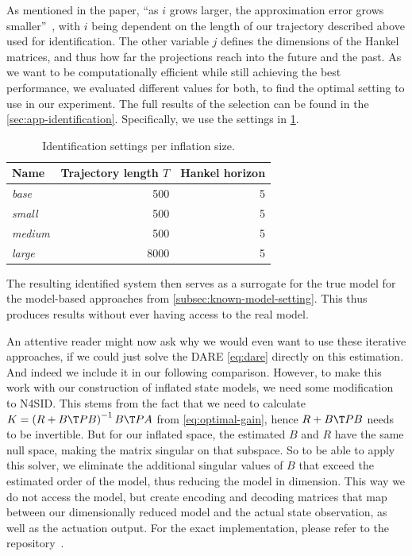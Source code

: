 As mentioned in the paper, ``as $i$ grows larger, the approximation error grows smaller''~\cite[Sec.~5.3]{VanOverschee1994N4SID},
with $i$ being dependent on the length of our trajectory described above used for identification. The other variable $j$
defines the dimensions of the Hankel matrices, and thus how far the projections reach into the future and the past.
As we want to be computationally efficient while still achieving the best performance, we evaluated different values
for both, to find the optimal setting to use in our experiment. The full results of the selection can be found in the
\cref{sec:app-identification}. Specifically, we use the settings in
\cref{tab:identification-settings}.
\begin{table}[htbp]
    \centering
    \caption{Identification settings per inflation size.}
    \label{tab:identification-settings}
    \begin{tabular}{@{}lrr@{}}
        \toprule
        Name & Trajectory length $T$ & Hankel horizon \\
        \midrule
        \emph{base}   & 500  & 5 \\
        \emph{small}  & 500  & 5 \\
        \emph{medium} & 500  & 5 \\
        \emph{large}  & 8000 & 5 \\
        \bottomrule
    \end{tabular}
\end{table}

The resulting identified system then serves as a surrogate for the true model
for the model-based approaches from \cref{subsec:known-model-setting}. This thus produces results without
ever having access to the real model.

An attentive reader might now ask why we would even want to use these iterative approaches, if we could just
solve the DARE \eqref{eq:dare} directly on this estimation. And indeed we include it in our following comparison.
However, to make this work with our construction of inflated state models, we need some modification to N4SID.
This stems from the fact that we need to calculate $K = \left( R + B\T P B \right)^{-1} B\T P A$ from
\eqref{eq:optimal-gain}, hence $R + B\T P B$ needs to be invertible.
But for our inflated space, the estimated $B$ and $R$ have the same null space, making the matrix singular on that subspace.
So to be able to apply this solver, we eliminate the additional singular values of $B$ that exceed the estimated order
of the model, thus reducing the model in dimension. This way we do not access the model, but create encoding and
decoding matrices that map between our dimensionally reduced model and the actual state observation, as well as the
actuation output. For the exact implementation, please refer to the repository~.

